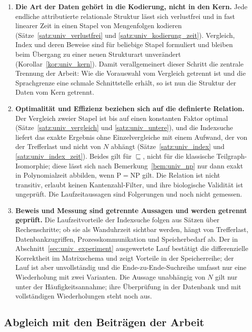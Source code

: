 \documentclass[a4paper,12pt, twoside]{report}
\theoremstyle{definition}
\begin{document}
\begin{enumerate}
	\item \textbf{Die Art der Daten gehört in die Kodierung, nicht in den Kern.} Jede endliche attributierte relationale Struktur lässt sich verlustfrei und in fast linearer Zeit in einen Stapel von Mengenfolgen kodieren (Sätze~\ref{satz:univ_verlustfrei} und \ref{satz:univ_kodierung_zeit}). Vergleich, Index und deren Beweise sind für beliebige Stapel formuliert und bleiben beim Übergang zu einer neuen Strukturart unverändert (Korollar~\ref{kor:univ_kern}). Damit verallgemeinert dieser Schritt die zentrale Trennung der Arbeit: Wie die Vorauswahl vom Vergleich getrennt ist und die Sprachgrenze eine schmale Schnittstelle erhält, so ist nun die Struktur der Daten vom Kern getrennt.
	\item \textbf{Optimalität und Effizienz beziehen sich auf die definierte Relation.} Der Vergleich zweier Stapel ist bis auf einen konstanten Faktor optimal (Sätze~\ref{satz:univ_vergleich} und \ref{satz:univ_untere}), und die Indexsuche liefert das exakte Ergebnis ohne Einzelvergleiche mit einem Aufwand, der von der Trefferlast und nicht von $N$ abhängt (Sätze~\ref{satz:univ_index} und \ref{satz:univ_index_zeit}). Beides gilt für $\sqsubseteq$, nicht für die klassische Teilgraph-Isomorphie; diese lässt sich nach Bemerkung~\ref{bem:univ_np} nur dann exakt in Polynomialzeit abbilden, wenn $\mathrm{P}=\mathrm{NP}$ gilt. Die Relation ist nicht transitiv, erlaubt keinen Kantenzahl-Filter, und ihre biologische Validität ist ungeprüft. Die Laufzeitaussagen sind Folgerungen und noch nicht gemessen.
\item \textbf{Beweis und Messung sind getrennte Aussagen und werden getrennt geprüft.} Die Laufzeitvorteile der Indexsuche folgen aus Sätzen über Rechenschritte; ob sie als Wanduhrzeit sichtbar werden, hängt von Trefferlast, Datenbankzugriffen, Prozesskommunikation und Speicherbedarf ab. Der in Abschnitt~\ref{sec:univ_experiment} ausgewertete Lauf bestätigt die differenzielle Korrektheit im Matrixschema und zeigt Vorteile in der Speicherreihe; der Lauf ist aber unvollständig und die Ende-zu-Ende-Suchreihe umfasst nur eine Wiederholung mit zwei Varianten. Die Aussage \glqq unabhängig von $N$\grqq{} gilt nur unter der Häufigkeitsannahme; ihre Überprüfung in der Datenbank und mit vollständigen Wiederholungen steht noch aus.
\end{enumerate}

\subsection{Abgleich mit den Beiträgen der Arbeit}
\end{document}
